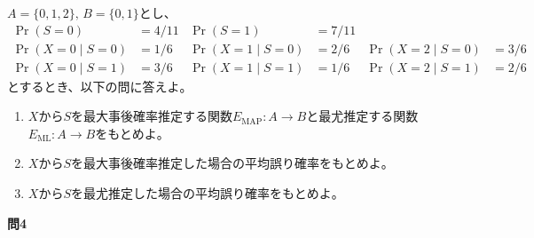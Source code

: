 \documentclass[lualatex,ja=standard,a4paper]{bxjsarticle}
\theoremstyle{definition}
\theoremstyle{remark}
\begin{document}
\vspace{1em}
$A=\{0,1,2\},\,B=\{0, 1\}$とし、
\begin{align*}
\Pr(S = 0) &= 4/11&
\Pr(S = 1) &= 7/11\\
\Pr(X=0\mid S=0) &= 1/6&
\Pr(X=1\mid S=0) &= 2/6&
\Pr(X=2\mid S=0) &= 3/6\\
\Pr(X=0\mid S=1) &= 3/6&
\Pr(X=1\mid S=1) &= 1/6&
\Pr(X=2\mid S=1) &= 2/6
\end{align*}
とするとき、以下の問に答えよ。
\vspace{1em}
\begin{enumerate}[label=(\arabic*)]
\setlength{\itemsep}{1em}
\item $X$から$S$を最大事後確率推定する関数$E_{\mathrm{MAP}}\colon A\to B$と最尤推定する関数$E_{\mathrm{ML}}\colon A\to B$をもとめよ。
\item $X$から$S$を最大事後確率推定した場合の平均誤り確率をもとめよ。
\item $X$から$S$を最尤推定した場合の平均誤り確率をもとめよ。
\end{enumerate}


\vspace{2em}
{\noindent\large\bfseries 問4}
\end{document}

